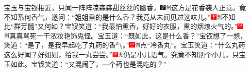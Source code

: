 宝玉与宝钗相近，只闻一阵阵凉森森甜丝丝的幽香，{\includegraphics[width=3mm]{../Images/00006}\includegraphics[width=3mm]{../Images/00011}\footnotesize \kaishu 这方是花香袭人正意。}竟不知系何香气，遂问：“姐姐熏的是什么香？我竟从未闻见过这味儿。”{\includegraphics[width=3mm]{../Images/00002}\includegraphics[width=3mm]{../Images/00011}\footnotesize \kaishu 不知比“群芳髓”又何如？}宝钗笑道：“我最怕熏香，好好的衣服，熏的烟燎火气的。”{\includegraphics[width=3mm]{../Images/00002}\includegraphics[width=3mm]{../Images/00011}\footnotesize \kaishu 真真骂死一干浓妆艳饰鬼怪。}宝玉道：“既如此，这是什么香？”宝钗想了一想，笑道：“是了，是我早起吃了丸药的香气。”{\includegraphics[width=3mm]{../Images/00002}\includegraphics[width=3mm]{../Images/00011}\footnotesize \kaishu 点“冷香丸”。}宝玉笑道：“什么丸药这么好闻？好姐姐，给我一丸尝尝。”{\includegraphics[width=3mm]{../Images/00002}\includegraphics[width=3mm]{../Images/00012}\footnotesize \kaishu 仍是小儿语气。究竟不知别个小儿，只宝玉如此。}宝钗笑道：“又混闹了，一个药也是混吃的？”

